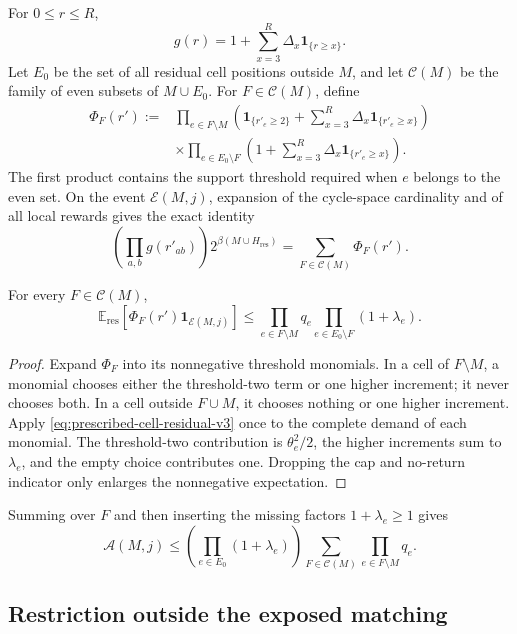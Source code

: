 For $0\le r\le R$,
\[
  g(r)=1+\sum_{x=3}^{R}\Delta_x\mathbf 1_{\{r\ge x\}}.
\]
Let $E_0$ be the set of all residual cell positions outside $M$, and let
$\mathcal C(M)$ be the family of even subsets of $M\cup E_0$. For
$F\in\mathcal C(M)$, define
\[
\begin{split}
  \Phi_F(r')
  :=
  &\prod_{e\in F\setminus M}
  \left(
    \mathbf 1_{\{r'_e\ge2\}}
    +
    \sum_{x=3}^{R}\Delta_x\mathbf 1_{\{r'_e\ge x\}}
  \right)\\
  &\times
  \prod_{e\in E_0\setminus F}
  \left(
    1+
    \sum_{x=3}^{R}\Delta_x\mathbf 1_{\{r'_e\ge x\}}
  \right).
\end{split}
\]
The first product contains the support threshold required when $e$ belongs to
the even set. On the event $\mathcal E(M,j)$, expansion of the cycle-space
cardinality and of all local rewards gives the exact identity
\[
  \left(\prod_{a,b}g(r'_{ab})\right)
  2^{\beta(M\cup H_{\mathrm{res}})}
  =
  \sum_{F\in\mathcal C(M)}\Phi_F(r').
\]

\begin{lemma}
\label{lem:fixed-even-set-expansion-v3}
For every $F\in\mathcal C(M)$,
\[
  \mathbb E_{\mathrm{res}}\!\left[
    \Phi_F(r')\mathbf 1_{\mathcal E(M,j)}
  \right]
  \le
  \prod_{e\in F\setminus M}q_e
  \prod_{e\in E_0\setminus F}(1+\lambda_e).
\]
\end{lemma}

\begin{proof}
Expand $\Phi_F$ into its nonnegative threshold monomials. In a cell of
$F\setminus M$, a monomial chooses either the threshold-two term or one higher
increment; it never chooses both. In a cell outside $F\cup M$, it chooses
nothing or one higher increment. Apply
\eqref{eq:prescribed-cell-residual-v3} once to the complete demand of each
monomial. The threshold-two contribution is $\theta_e^2/2$, the higher
increments sum to $\lambda_e$, and the empty choice contributes one. Dropping
the cap and no-return indicator only enlarges the nonnegative expectation.
\end{proof}

Summing over $F$ and then inserting the missing factors
$1+\lambda_e\ge1$ gives
\begin{equation}
  \mathcal A(M,j)
  \le
  \left(\prod_{e\in E_0}(1+\lambda_e)\right)
  \sum_{F\in\mathcal C(M)}
    \prod_{e\in F\setminus M}q_e.
  \label{eq:lambda-even-factorization-v3}
\end{equation}

\subsection{Restriction outside the exposed matching}


